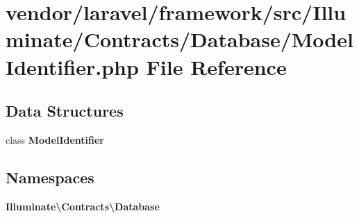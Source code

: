 \section{vendor/laravel/framework/src/\+Illuminate/\+Contracts/\+Database/\+Model\+Identifier.php File Reference}
\label{_model_identifier_8php}
\subsection*{Data Structures}
\begin{DoxyCompactItemize}
\item 
class {\bf Model\+Identifier}
\end{DoxyCompactItemize}
\subsection*{Namespaces}
\begin{DoxyCompactItemize}
\item 
 {\bf Illuminate\textbackslash{}\+Contracts\textbackslash{}\+Database}
\end{DoxyCompactItemize}
